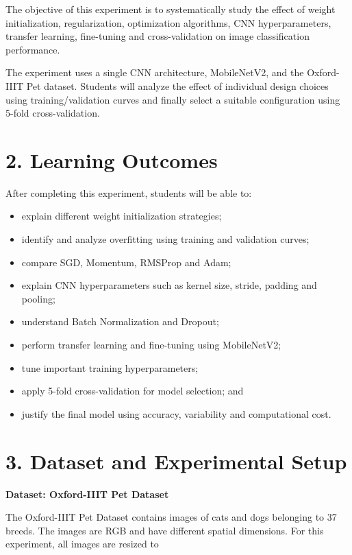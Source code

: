 \documentclass[10pt]{article}
\begin{document}
The objective of this experiment is to systematically study the effect of
weight initialization, regularization, optimization algorithms, CNN
hyperparameters, transfer learning, fine-tuning and cross-validation on
image classification performance.

The experiment uses a single CNN architecture, MobileNetV2, and the
Oxford-IIIT Pet dataset. Students will analyze the effect of individual
design choices using training/validation curves and finally select a
suitable configuration using 5-fold cross-validation.

\section*{2. Learning Outcomes}

After completing this experiment, students will be able to:

\begin{itemize}
\item explain different weight initialization strategies;
\item identify and analyze overfitting using training and validation curves;
\item compare SGD, Momentum, RMSProp and Adam;
\item explain CNN hyperparameters such as kernel size, stride, padding and pooling;
\item understand Batch Normalization and Dropout;
\item perform transfer learning and fine-tuning using MobileNetV2;
\item tune important training hyperparameters;
\item apply 5-fold cross-validation for model selection; and
\item justify the final model using accuracy, variability and computational cost.
\end{itemize}

\section*{3. Dataset and Experimental Setup}

\textbf{Dataset: Oxford-IIIT Pet Dataset}

The Oxford-IIIT Pet Dataset contains images of cats and dogs belonging
to 37 breeds. The images are RGB and have different spatial dimensions.
For this experiment, all images are resized to
\end{document}
